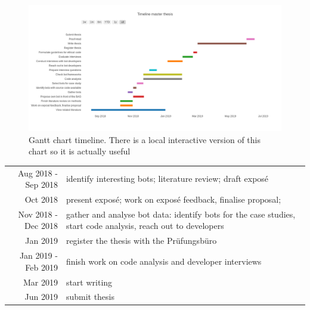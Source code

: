 \documentclass[pdftex,a4paper,11pt]{scrartcl}
\begin{document}
\begin{figure}[!h]
	\centering
		\includegraphics[width=1\textwidth]{../charts/gantt-thesis.png}
    \caption{Gantt chart timeline. There is a local interactive version of this chart so it is actually useful}
\end{figure}

\begin{tabular}{r p{11cm}}
    Aug 2018 - Sep 2018 & identify interesting bots; literature review; draft exposé \\
           Oct 2018 & present exposé; work on exposé feedback, finalise proposal;\\
    Nov 2018 - Dec 2018 & gather and analyse bot data: identify bots for the case studies, start code analysis, reach out to developers \\
           Jan 2019 & register the thesis with the Prüfungsbüro \\
Jan 2019 - Feb 2019 & finish work on code analysis and developer interviews \\
           Mar 2019 & start writing \\
           Jun 2019 & submit thesis \\
\end{tabular}

{}   %

\end{document}
